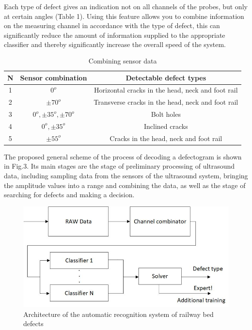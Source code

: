 \documentclass[a4paper, 12pt]{article}
\begin{document}
Each type of defect gives an indication not on all channels of the probes, but only at certain angles (Table 1). Using this feature allows you to combine information on the measuring channel in accordance with the type of defect, this can significantly reduce the amount of information supplied to the appropriate classifier and thereby significantly increase the overall speed of the system.

\begin{table}[h]
	\caption{Combining sensor data}
	\begin{tabular}{| c | c | c |}
		\hline
		N & Sensor combination & Detectable defect types \\
		\hline
		1 & $0^o$ & Horizontal cracks in the head, neck and foot rail \\
		\hline
		2 & $\pm70^o$ & Transverse cracks in the head, neck and foot rail \\
		\hline
		3 & $0^o, \pm35^o, \pm70^o$ & Bolt holes \\
		\hline
		4 & $0^o, \pm35^o$ & Inclined cracks \\
		\hline
		5 & $\pm55^o$ & Cracks in the head, neck and foot rail \\
		\hline
	\end{tabular}	
\end{table}

The proposed general scheme of the process of decoding a defectogram is shown in Fig.3. Its main stages are the stage of preliminary processing of ultrasound data, including sampling data from the sensors of the ultrasound system, bringing the amplitude values into a range and combining the data, as well as the stage of searching for defects and making a decision.

\begin{figure}[h!]
	\includegraphics[width=\textwidth]{fig3}
	\caption{Architecture of the automatic recognition system of railway bed defects}
\end{figure}
\end{document}

